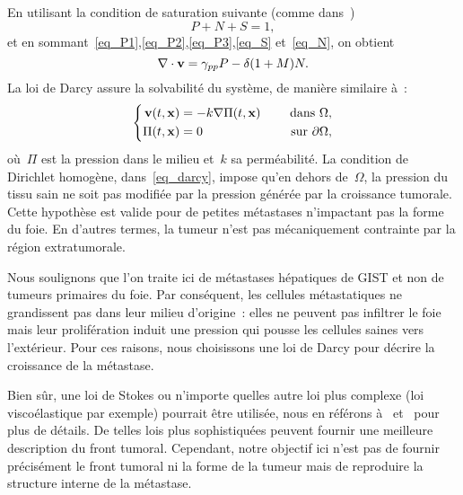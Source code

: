 \documentclass[main.tex]{subfiles}
\begin{document}
En utilisant la condition de saturation suivante 
(comme dans~\cite{ambrosi2002})
\begin{equation}\label{eq_saturation}
P+N+S=1,
\end{equation}
et en sommant~\eqref{eq_P1},\eqref{eq_P2},\eqref{eq_P3},\eqref{eq_S} et~\eqref{eq_N},
on obtient 
\begin{equation}\label{eq_divv}
\nabla\cdot \mathbf{v} = \gamma_{pp} P - \delta (1+M)N.
\end{equation}
La loi de Darcy assure la solvabilité du système, de manière similaire à~\cite{Ribba2006532}:
\begin{equation}\label{eq_darcy}
\left\{
\begin{aligned}
\mathbf{v}(t,\mathbf{x}) &=-k\nabla \Pi(t,\mathbf{x}) & \quad \textrm{ dans }  \Omega , \\
\Pi(t,\mathbf{x}) &=0 & \quad \textrm{ sur  } \partial \Omega,
\end{aligned}
\right.
\end{equation}
où~$\Pi$ est la pression %
dans le milieu et~$k$ sa perméabilité. 
La condition de Dirichlet homogène, dans~\eqref{eq_darcy}, impose qu'en dehors de~$\Omega$, la pression du tissu sain ne soit pas modifiée par la pression générée par la croissance tumorale. Cette hypothèse est valide pour de petites métastases n'impactant pas la forme du foie. En d'autres termes, la tumeur n'est pas mécaniquement contrainte par la région extratumorale. 




Nous soulignons que l'on traite ici de métastases hépatiques de GIST et non de tumeurs primaires du foie. Par conséquent, les cellules métastatiques ne grandissent pas dans leur milieu d'origine~: elles ne peuvent pas infiltrer le foie mais leur prolifération induit une pression qui pousse les cellules saines vers l'extérieur. Pour ces raisons, nous choisissons une loi de Darcy pour décrire la croissance de la métastase. 


Bien sûr, une loi de Stokes ou n'importe quelles autre loi plus complexe (loi viscoélastique par exemple) pourrait être utilisée, nous en référons à~\cite{Bresch2009}  et~\cite{ambrosi2002,byrne2003} pour plus de détails. 
De telles lois plus sophistiquées %
peuvent fournir une meilleure description du front tumoral. Cependant, notre objectif ici n'est pas de fournir précisément le front tumoral ni la forme de la tumeur mais de reproduire la structure interne de la métastase.
\end{document}
